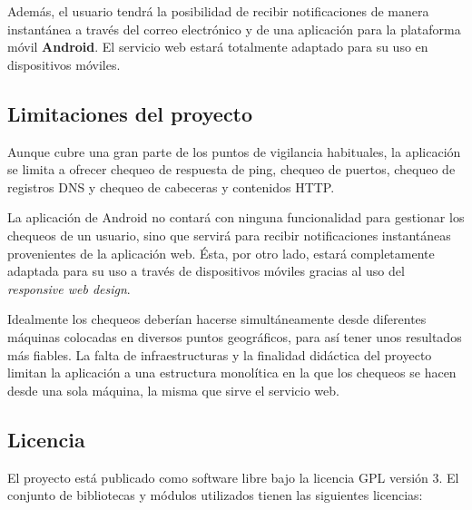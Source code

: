 Además, el usuario tendrá la posibilidad de recibir notificaciones de manera
instantánea a través del correo electrónico y de una aplicación para la
plataforma móvil \textbf{Android}. El servicio web estará totalmente adaptado
para su uso en dispositivos móviles.

\subsection{Limitaciones del proyecto}
Aunque cubre una gran parte de los puntos de vigilancia habituales, la
aplicación se limita a ofrecer chequeo de respuesta de ping, chequeo de puertos,
chequeo de registros DNS y chequeo de cabeceras y contenidos HTTP.

La aplicación de Android no contará con ninguna funcionalidad para gestionar los
chequeos de un usuario, sino que servirá para recibir notificaciones instantáneas
provenientes de la aplicación web. Ésta, por otro lado, estará completamente
adaptada para su uso a través de dispositivos móviles gracias al uso del
\textit{responsive web design}.

Idealmente los chequeos deberían hacerse simultáneamente desde diferentes
máquinas colocadas en diversos puntos geográficos, para así tener unos
resultados más fiables. La falta de infraestructuras y la finalidad didáctica
del proyecto limitan la aplicación a una estructura monolítica en la que los
chequeos se hacen desde una sola máquina, la misma que sirve el servicio web.

\subsection{Licencia}
El proyecto está publicado como software libre bajo la licencia
\ac{GPL} versión 3. El conjunto de bibliotecas y módulos utilizados
tienen las siguientes licencias:

